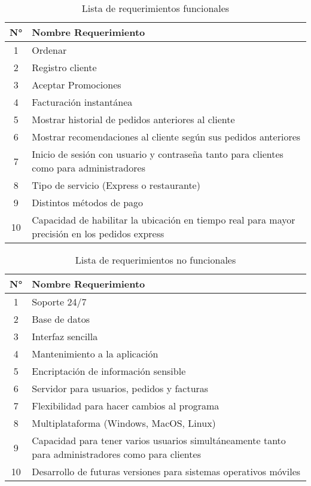 \documentclass[conference]{IEEEtran}
\begin{document}
\begin{table}[H]
	\centering
	\caption{Lista de requerimientos funcionales}
\begin{adjustbox}{width=0.45\textwidth}

\begin{tabular}{|c|l|}
\hline 
N° & Nombre Requerimiento \\ 
\hline 
1 & Ordenar \\ 
\hline 
2 & Registro cliente \\ 
\hline 
3 & Aceptar Promociones \\ 
\hline 
4 & Facturación instantánea \\ 
\hline 
5 & Mostrar historial de pedidos anteriores al cliente \\ 
\hline 
6 & Mostrar recomendaciones al cliente según sus pedidos anteriores \\ 
\hline 
7 & Inicio de sesión con usuario y contraseña tanto para clientes como para administradores \\ 
\hline 
8 & Tipo de servicio (Express o restaurante) \\ 
\hline 
9 & Distintos métodos de pago \\ 
\hline 
10 & Capacidad de habilitar la ubicación en tiempo real para mayor precisión en los pedidos express \\ 
\hline

\end{tabular}
\end{adjustbox}
\end{table}%


\begin{table}[H]
	\centering
	\caption{Lista de requerimientos no funcionales}
\begin{adjustbox}{width=0.45\textwidth}

\begin{tabular}{|c|l|}
\hline 
N° & Nombre Requerimiento \\ 
\hline 
1 & Soporte 24/7 \\ 
\hline 
2 & Base de datos \\ 
\hline 
3 & Interfaz sencilla \\ 
\hline 
4 & Mantenimiento a la aplicación \\ 
\hline 
5 & Encriptación de información sensible \\ 
\hline 
6 & Servidor para usuarios, pedidos y facturas \\ 
\hline 
7 & Flexibilidad para hacer cambios al programa \\ 
\hline 
8 & Multiplataforma (Windows, MacOS, Linux) \\ 
\hline 
9 & Capacidad para tener varios usuarios simultáneamente 		tanto para administradores como para clientes \\ 
\hline 
10 & Desarrollo de futuras versiones para sistemas operativos móviles \\ 
\hline

\end{tabular}
\end{adjustbox}
\end{table}%
\end{document}
